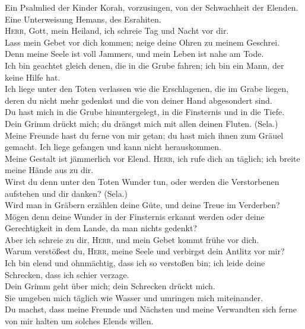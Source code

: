  Ein Psalmlied der Kinder Korah, vorzusingen, von der
Schwachheit der Elenden. Eine Unterweisung Hemans, des Esrahiten.\\
 \textsc{Herr}, Gott, mein Heiland, ich schreie Tag und
Nacht vor dir.\\
 Lass mein Gebet vor dich kommen; neige deine Ohren zu
meinem Geschrei.\\
 Denn meine Seele ist voll Jammers, und mein Leben ist
nahe am Tode.\\
 Ich bin geachtet gleich denen, die in die Grube fahren;
ich bin ein Mann, der keine Hilfe hat.\\
 Ich liege unter den Toten verlassen wie die Erschlagenen,
die im Grabe liegen, deren du nicht mehr gedenkst und die von deiner
Hand abgesondert sind.\\
 Du hast mich in die Grube hinuntergelegt, in die
Finsternis und in die Tiefe.\\
 Dein Grimm drückt mich; du drängst mich mit allen deinen
Fluten. (Sela.)\\
 Meine Freunde hast du ferne von mir getan; du hast mich
ihnen zum Gräuel gemacht. Ich liege gefangen und kann nicht
herauskommen.\\
 Meine Gestalt ist jämmerlich vor Elend. \textsc{Herr},
ich rufe dich an täglich; ich breite meine Hände aus zu dir.\\
 Wirst du denn unter den Toten Wunder tun, oder werden
die Verstorbenen aufstehen und dir danken? (Sela.)\\
 Wird man in Gräbern erzählen deine Güte, und deine Treue
im Verderben?\\
 Mögen denn deine Wunder in der Finsternis erkannt werden
oder deine Gerechtigkeit in dem Lande, da man nichts gedenkt?\\
 Aber ich schreie zu dir, \textsc{Herr}, und mein Gebet
kommt frühe vor dich.\\
 Warum verstößest du, \textsc{Herr}, meine Seele und
verbirgst dein Antlitz vor mir?\\
 Ich bin elend und ohnmächtig, dass ich so verstoßen bin;
ich leide deine Schrecken, dass ich schier verzage.\\
 Dein Grimm geht über mich; dein Schrecken drückt mich.\\
 Sie umgeben mich täglich wie Wasser und umringen mich
miteinander.\\
 Du machst, dass meine Freunde und Nächsten und meine
Verwandten sich ferne von mir halten um solches Elends willen.

